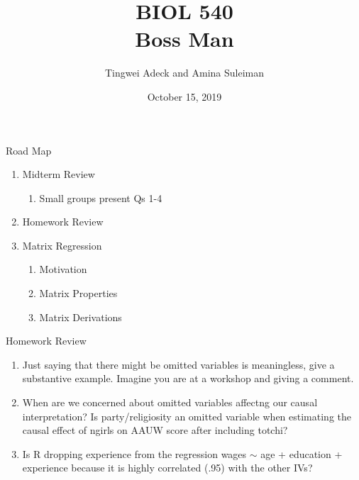 \documentclass[11pt]{beamer}
\title{BIOL 540 \\ Boss Man}
\author{Tingwei Adeck and Amina Suleiman}
\date{October 15, 2019}
\begin{document}
\begin{frame}
\titlepage
\end{frame}


\begin{frame}{Road Map}

\vspace{3mm}
\begin{enumerate}
\item Midterm Review
\begin{enumerate}
\item Small groups present Qs 1-4
\end{enumerate}
\item Homework Review
\item Matrix Regression
\begin{enumerate}
\item Motivation
\item Matrix Properties
\item Matrix Derivations
\end{enumerate}
\end{enumerate}

\end{frame}

\begin{frame}{Homework Review}

\begin{enumerate}
\item Just saying that there might be omitted variables is meaningless, give a substantive example. Imagine you are at a workshop and giving a comment. 
\item When are we concerned about omitted variables affectng our causal interpretation? Is party/religiosity an omitted variable when estimating the causal effect of ngirls on AAUW score after including totchi?
\item Is R dropping experience from the regression wages $\sim$ age + education + experience because it is highly correlated (.95) with the other IVs? 
\end{enumerate}

\end{frame}
\end{document}
